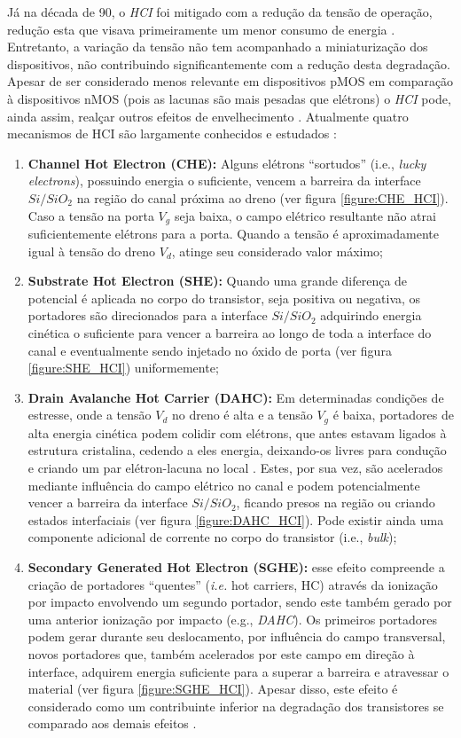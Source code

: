 Já na década de 90, o \textit{HCI} foi mitigado com a redução da tensão de operação, redução esta que visava primeiramente um menor consumo de energia \cite{Maricau2013}. Entretanto, a variação da tensão não tem acompanhado a miniaturização \cite{Wang2007}\cite{Bravaix2009} dos dispositivos, não contribuindo significantemente com a redução desta degradação. Apesar de ser considerado menos relevante em dispositivos pMOS em comparação à dispositivos nMOS (pois as lacunas são mais pesadas que elétrons) o \textit{HCI} pode, ainda assim, realçar outros efeitos de envelhecimento \cite{Parthasarathy2006}. Atualmente quatro mecanismos de HCI são largamente conhecidos e estudados \cite{Maricau2013}:
\begin{enumerate}
\item \textbf{Channel Hot Electron (CHE):} Alguns elétrons ``sortudos'' (i.e., \textit{lucky electrons}), possuindo energia o suficiente, vencem a barreira da interface $Si/SiO_{2}$ na região do canal próxima ao dreno (ver figura \ref{figure:CHE_HCI}). Caso a tensão na porta $V_{g}$ seja baixa, o campo elétrico resultante não atrai suficientemente elétrons para a porta.   Quando a tensão  é aproximadamente igual à tensão do dreno $V_{d}$, atinge seu considerado valor máximo;
\item \textbf{Substrate Hot Electron (SHE):} Quando uma grande diferença de potencial é aplicada no corpo do transistor, seja positiva ou negativa, os portadores são direcionados para a interface $Si/SiO_{2}$ adquirindo energia cinética o suficiente para vencer a barreira ao longo de toda a interface do canal  e eventualmente sendo injetado no óxido de porta (ver figura \ref{figure:SHE_HCI}) uniformemente;
\item \textbf{Drain Avalanche Hot Carrier (DAHC):}  Em determinadas condições de estresse, onde a tensão $V_{d}$ no dreno é alta e a tensão $V_{g}$ é baixa, portadores de alta energia cinética podem colidir com elétrons, que antes estavam  ligados à estrutura cristalina, cedendo a eles energia, deixando-os livres para condução e criando um par elétron-lacuna no local \cite{Sze2007}. Estes, por sua vez, são acelerados mediante influência do campo elétrico no canal e podem potencialmente vencer a barreira da interface $Si/SiO_{2}$, ficando presos na região ou criando estados interfaciais (ver figura \ref{figure:DAHC_HCI}). Pode existir ainda uma componente adicional de corrente no corpo do transistor (i.e., \textit{bulk});
\item \textbf{Secondary Generated Hot Electron (SGHE):} esse efeito compreende a criação de portadores ``quentes'' (\textit{i.e.} hot carriers, HC) através da ionização por impacto envolvendo um segundo portador, sendo este também gerado por uma anterior ionização por impacto (e.g., \textit{DAHC}). Os primeiros portadores podem gerar durante seu deslocamento, por influência do campo transversal, novos portadores que, também acelerados por este campo em direção à interface, adquirem energia suficiente para a superar a barreira e atravessar o material (ver figura \ref{figure:SGHE_HCI}). Apesar disso, este efeito é considerado como um contribuinte inferior na degradação dos transistores se comparado aos demais efeitos \cite{Maricau2013}.
\end{enumerate}
